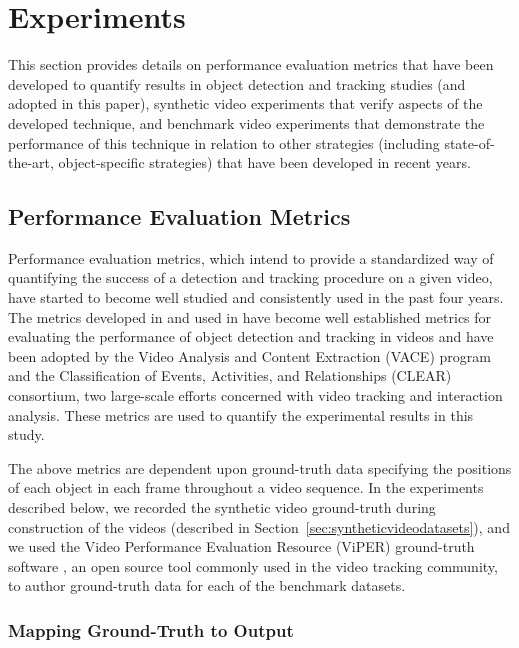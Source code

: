 \documentclass[twocolumn, final]{svjour3}
\begin{document}

\section{Experiments}
\label{sec:experiments}

This section provides details on performance evaluation metrics that have been developed to quantify results in object detection and tracking studies (and adopted in this paper), synthetic video experiments that verify aspects of the developed technique, and benchmark video experiments that demonstrate the performance of this technique in relation to other strategies (including state-of-the-art, object-specific strategies) that have been developed in recent years.   


\subsection{Performance Evaluation Metrics}
\label{sec:performanceevaluationmetrics}

Performance evaluation metrics, which intend to provide a standardized way of quantifying the success of a detection and tracking procedure on a given video, have started to become well studied and consistently used in the past four years. The metrics developed in \cite{kasturi_2008} and used in \cite{ellis_2010, taj_2007, lee_2009} have become well established metrics for evaluating the performance of object detection and tracking in videos and have been adopted by the Video Analysis and Content Extraction (VACE) program and the Classification of Events, Activities, and Relationships (CLEAR) consortium, two large-scale efforts concerned with video tracking and interaction analysis. These metrics are used to quantify the experimental results in this study.

The above metrics are dependent upon ground-truth data specifying the positions of each object in each frame throughout a video sequence. In the experiments described below, we recorded the synthetic video ground-truth during construction of the videos (described in Section~\ref{sec:syntheticvideodatasets}), and we used the Video Performance Evaluation Resource (ViPER) ground-truth software \cite{doermann_2000}, an open source tool commonly used in the video tracking community, to author ground-truth data for each of the benchmark datasets.


\subsubsection{Mapping Ground-Truth to Output}
\label{sec:mappingtoground}
\end{document}
